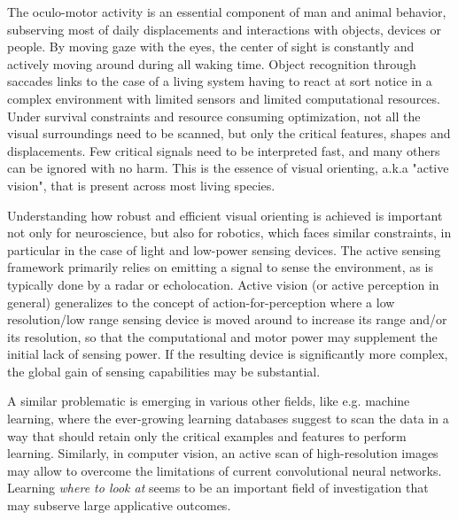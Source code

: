 \documentclass[12pt,twoside,openright]{article}
\begin{document}
	
	The oculo-motor activity is an essential component of man and animal behavior, subserving most of daily displacements and interactions with objects, devices or people. By moving gaze with the eyes, the center of sight is constantly and actively moving around during all waking time.  %
	Object recognition through saccades links to the case of a living system having to react at sort notice in a complex environment with limited sensors and limited computational resources. Under survival constraints and resource consuming optimization, not all the visual surroundings need to be scanned, but only the critical features, shapes and displacements. Few critical signals need to be interpreted fast, and many others can be ignored with no harm. This is the essence of visual orienting, a.k.a "active vision", that is present across most living species.  
	
	Understanding how robust and efficient visual orienting is achieved is important not only for neuroscience, but also for robotics, which faces similar constraints, in particular in the case of light and low-power sensing devices.  The active sensing framework primarily relies on emitting a signal to sense the environment, as is typically done by a radar or echolocation. Active vision (or active perception in general) generalizes to the concept of action-for-perception where a low resolution/low range sensing device is moved around to increase its range and/or its resolution, so that the computational and motor power may supplement the initial lack of sensing power. {\color{magenta} If the resulting device is significantly more complex, the global gain of sensing capabilities may be substantial.}
	  
	A similar problematic is emerging in various other fields, like e.g. machine learning, where the ever-growing  learning databases suggest to scan the data in a way that should retain only the critical examples and features to perform learning. Similarly, in computer vision, an active scan of high-resolution images may allow to overcome the limitations of current convolutional neural networks. Learning \emph{where to look at} seems to be an important field of investigation that may subserve large applicative outcomes.
	
	
\end{document}
